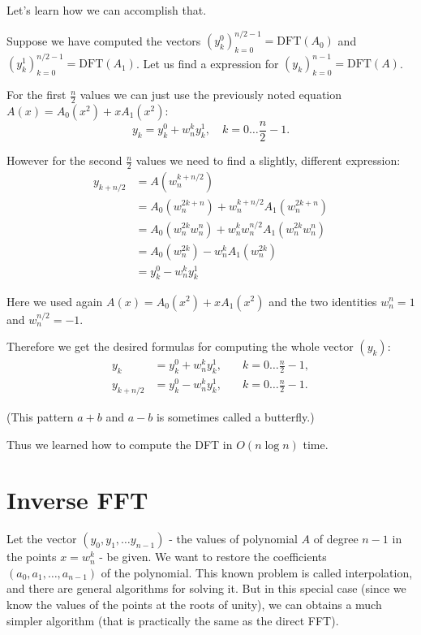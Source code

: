 \documentclass{article}
\begin{document}
Let's learn how we can accomplish that.

Suppose we have computed the vectors $\left(y_k^0\right)_{k=0}^{n/2-1} = \text{DFT}(A_0)$ and $\left(y_k^1\right)_{k=0}^{n/2-1} = \text{DFT}(A_1)$. Let us find a expression for $\left(y_k\right)_{k=0}^{n-1} = \text{DFT}(A)$.

For the first $\frac{n}{2}$ values we can just use the previously noted equation $A(x) = A_0(x^2) + x A_1(x^2)$:
$$y_k = y_k^0 + w_n^k y_k^1, \quad k = 0 \dots \frac{n}{2} - 1.$$

However for the second $\frac{n}{2}$ values we need to find a slightly, different expression:
$$\begin{align} y_{k+n/2} &= A\left(w_n^{k+n/2}\right) \\ &= A_0\left(w_n^{2k+n}\right) + w_n^{k + n/2} A_1\left(w_n^{2k+n}\right) \\ &= A_0\left(w_n^{2k} w_n^n\right) + w_n^k w_n^{n/2} A_1\left(w_n^{2k} w_n^n\right) \\ &= A_0\left(w_n^{2k}\right) - w_n^k A_1\left(w_n^{2k}\right) \\ &= y_k^0 - w_n^k y_k^1 \end{align}$$

Here we used again $A(x) = A_0(x^2) + x A_1(x^2)$ and the two identities $w_n^n = 1$ and $w_n^{n/2} = -1$.

Therefore we get the desired formulas for computing the whole vector $(y_k)$:
$$\begin{align} y_k &= y_k^0 + w_n^k y_k^1, &\quad k = 0 \dots \frac{n}{2} - 1, \\ y_{k+n/2} &= y_k^0 - w_n^k y_k^1, &\quad k = 0 \dots \frac{n}{2} - 1. \end{align}$$

(This pattern $a + b$ and $a - b$ is sometimes called a butterfly.)

Thus we learned how to compute the DFT in $O(n \log n)$ time.

\section{Inverse FFT}

Let the vector $(y_0, y_1, \dots y_{n-1})$ - the values of polynomial $A$ of degree $n - 1$ in the points $x = w_n^k$ - be given. We want to restore the coefficients $(a_0, a_1, \dots, a_{n-1})$ of the polynomial. This known problem is called interpolation, and there are general algorithms for solving it. But in this special case (since we know the values of the points at the roots of unity), we can obtains a much simpler algorithm (that is practically the same as the direct FFT).
\end{document}
